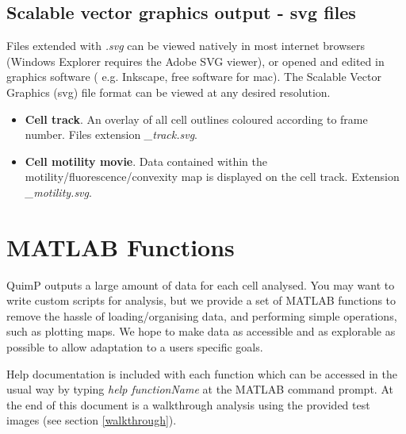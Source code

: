 \documentclass[a4paper,12pt]{article}
\begin{document}
\subsection{Scalable vector graphics output - svg files}

Files extended with
\textit{.svg} can be viewed natively in most internet browsers (Windows Explorer requires the Adobe SVG viewer), or opened and edited
in graphics software ( e.g. Inkscape, free software for mac).  The 
Scalable Vector Graphics (svg) file format can be viewed at any desired resolution. 

\begin{itemize}

\item \textbf{Cell track}.  An overlay of all cell outlines coloured according to frame number. Files extension \textit{\_track.svg}.

\item \textbf{Cell motility movie}.  Data contained within the motility/fluorescence/convexity map is displayed on the cell track. Extension \textit{\_motility.svg}.

\end{itemize}



\section{MATLAB Functions}
\label{matlab}

QuimP outputs a large amount of data for each cell analysed.
You may want to write custom scripts for analysis, but we provide
a set of MATLAB functions to remove the hassle of loading/organising data, and performing
simple operations, such as plotting maps.
We hope to make data as accessible and as explorable as possible to allow adaptation to a users specific goals.

Help documentation is included with each function which can be accessed in the
usual way by typing \textit{help functionName} at
the MATLAB command prompt.  At the end of this document is a walkthrough analysis using the provided test images
(see section \ref{walkthrough}).
\end{document}
